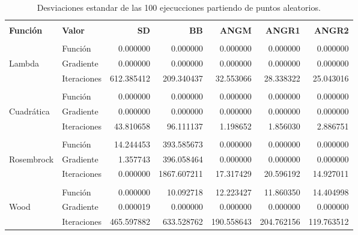 \begin{table}[H]
    \changefontsizes{11pt}
    \centering
    \begin{tabular}{llrrrrr}
        \hline                                                                                                          \\
        \textbf{Función} & \textbf{Valor} & \textbf{SD} & \textbf{BB} & \textbf{ANGM} & \textbf{ANGR1} & \textbf{ANGR2} \\[0.1cm]\hline
        \\
                         & Función        & 0.000000    & 0.000000    & 0.000000      & 0.000000       & 0.000000       \\[0.25cm]
        Lambda           & Gradiente      & 0.000000    & 0.000000    & 0.000000      & 0.000000       & 0.000000       \\[0.25cm]
                         & Iteraciones    & 612.385412  & 209.340437  & 32.553066     & 28.338322      & 25.043016      \\[0.25cm]\hline
        \\
                         & Función        & 0.000000    & 0.000000    & 0.000000      & 0.000000       & 0.000000       \\[0.25cm]
        Cuadrática       & Gradiente      & 0.000000    & 0.000000    & 0.000000      & 0.000000       & 0.000000       \\[0.25cm]
                         & Iteraciones    & 43.810658   & 96.111137   & 1.198652      & 1.856030       & 2.886751       \\[0.25cm]\hline
        \\
                         & Función        & 14.244453   & 393.585673  & 0.000000      & 0.000000       & 0.000000       \\[0.25cm]
        Rosembrock       & Gradiente      & 1.357743    & 396.058464  & 0.000000      & 0.000000       & 0.000000       \\[0.25cm]
                         & Iteraciones    & 0.000000    & 1867.607211 & 17.317429     & 20.596192      & 14.927011      \\[0.25cm]\hline
        \\
                         & Función        & 0.000000    & 10.092718   & 12.223427     & 11.860350      & 14.404998      \\[0.25cm]
        Wood             & Gradiente      & 0.000019    & 0.000000    & 0.000000      & 0.000000       & 0.000000       \\[0.25cm]
                         & Iteraciones    & 465.597882  & 633.528762  & 190.558643    & 204.762156     & 119.763512     \\[0.25cm]\hline
    \end{tabular}
    \caption{Desviaciones estandar de las 100 ejecucciones partiendo de puntos aleatorios.}
    \label{table:deviation}
\end{table}